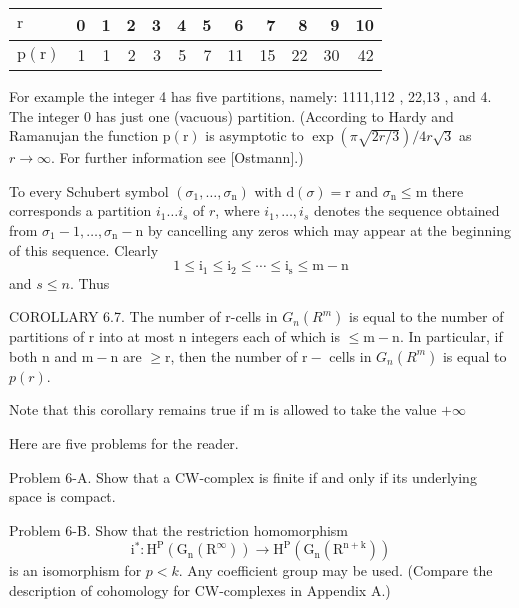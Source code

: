 \documentclass[10pt]{article}
\begin{document}
\begin{tabular}{|l|rrrrrrrrrrr|}
\hline
$\mathrm{r}$ & 0 & 1 & 2 & 3 & 4 & 5 & 6 & 7 & 8 & 9 & 10 \\
\hline
$\mathrm{p}(\mathrm{r})$ & 1 & 1 & 2 & 3 & 5 & 7 & 11 & 15 & 22 & 30 & 42 \\
\hline
\end{tabular}

For example the integer 4 has five partitions, namely: 1111,112 , 22,13 , and 4. The integer 0 has just one (vacuous) partition. (According to Hardy and Ramanujan the function $\mathrm{p}(\mathrm{r})$ is asymptotic to $\exp (\pi \sqrt{2 r / 3}) / 4 r \sqrt{3}$ as $r \rightarrow \infty$. For further information see [Ostmann].)

To every Schubert symbol $\left(\sigma_{1}, \ldots, \sigma_{\mathrm{n}}\right)$ with $\mathrm{d}(\sigma)=\mathrm{r}$ and $\sigma_{\mathrm{n}} \leq \mathrm{m}$ there corresponds a partition $i_{1} \ldots i_{s}$ of $r$, where $i_{1}, \ldots, i_{s}$ denotes the sequence obtained from $\sigma_{1}-1, \ldots, \sigma_{\mathrm{n}}-\mathrm{n}$ by cancelling any zeros which may appear at the beginning of this sequence. Clearly
$$
1 \leq \mathrm{i}_{1} \leq \mathrm{i}_{2} \leq \cdots \leq \mathrm{i}_{\mathrm{s}} \leq \mathrm{m}-\mathrm{n}
$$
and $s \leq n$. Thus

COROLLARY 6.7. The number of r-cells in $G_{n}\left(R^{m}\right)$ is equal to the number of partitions of $\mathrm{r}$ into at most $\mathrm{n}$ integers each of which is $\leq \mathrm{m}-\mathrm{n}$. In particular, if both $\mathrm{n}$ and $\mathrm{m}-\mathrm{n}$ are $\geq \mathrm{r}$, then the number of $\mathrm{r}-$ cells in $G_{n}\left(R^{m}\right)$ is equal to $p(r)$.

Note that this corollary remains true if $\mathrm{m}$ is allowed to take the value $+\infty$

Here are five problems for the reader.

Problem 6-A. Show that a CW-complex is finite if and only if its underlying space is compact.

Problem 6-B. Show that the restriction homomorphism
$$
\mathrm{i}^{*}: \mathrm{H}^{\mathrm{P}}\left(\mathrm{G}_{\mathrm{n}}\left(\mathrm{R}^{\infty}\right)\right) \rightarrow \mathrm{H}^{\mathrm{P}}\left(\mathrm{G}_{\mathrm{n}}\left(\mathrm{R}^{\mathrm{n}+\mathrm{k}}\right)\right)
$$
is an isomorphism for $p<k$. Any coefficient group may be used. (Compare the description of cohomology for CW-complexes in Appendix A.)
\end{document}
